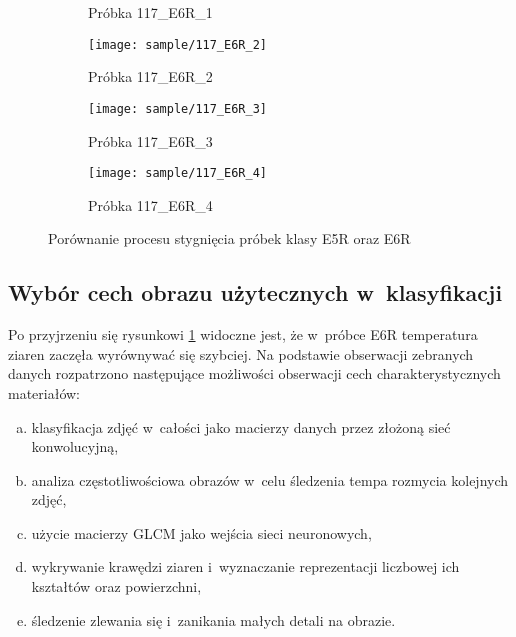 \begin{figure}[htbp]
\begin{subfigure}{0.3\textwidth}
		\caption{Próbka 117\_E6R\_1}
	\end{subfigure}
	\hspace{0.25cm}
	\vspace{0.5cm}
	\begin{subfigure}{0.3\textwidth}
		\centering
		\texttt{[image: sample/117\_E6R\_2]}
		\caption{Próbka 117\_E6R\_2}
	\end{subfigure}
	\hspace{0.25cm}
	\begin{subfigure}{0.3\textwidth}
		\centering
		\texttt{[image: sample/117\_E6R\_3]}
		\caption{Próbka 117\_E6R\_3}
	\end{subfigure}
	\begin{subfigure}{0.3\textwidth}
		\centering
		\texttt{[image: sample/117\_E6R\_4]}
		\caption{Próbka 117\_E6R\_4}
	\end{subfigure}
	\caption{Porównanie procesu stygnięcia próbek klasy E5R oraz E6R}
	\label{fig:samplecompare}
\end{figure}

\subsection{Wybór cech obrazu użytecznych w~klasyfikacji}
Po przyjrzeniu się rysunkowi \ref{fig:samplecompare} widoczne  jest, że
w~próbce E6R temperatura ziaren zaczęła wyrównywać się szybciej.
Na podstawie obserwacji zebranych danych rozpatrzono następujące możliwości
obserwacji cech charakterystycznych materiałów:
\begin{enumerate}[a)]
	\item \label{it:imgcnn} 
	      klasyfikacja zdjęć w~całości jako macierzy danych przez złożoną sieć
	      konwolucyjną,
	\item \label{it:fft} 
	      analiza częstotliwościowa obrazów w~celu śledzenia tempa rozmycia
	      kolejnych zdjęć,
	\item \label{it:glcm} 
	      użycie macierzy GLCM jako wejścia sieci neuronowych,
	\item \label{it:edge}
	      wykrywanie krawędzi ziaren i~wyznaczanie reprezentacji liczbowej
	      ich kształtów oraz powierzchni,
	\item \label{it:blob}
	      śledzenie zlewania się i~zanikania małych detali na obrazie.
\end{enumerate}

